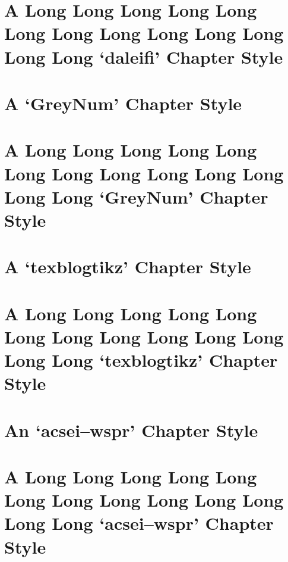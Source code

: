 \documentclass[10pt,a4paper,extrafontsizes,oldfontcommands,oneside]{memoir}
\begin{document}
\chapter{A Long Long Long Long Long Long Long Long Long Long Long Long Long `daleifi' Chapter Style} %
\label{chap:a_long_daleifi_chapter_style}



\chapter{A `GreyNum' Chapter Style} %
\label{chap:a_GreyNum_chapter_style}



\chapter{A Long Long Long Long Long Long Long Long Long Long Long Long Long `GreyNum' Chapter Style} %
\label{chap:a_long_GreyNum_chapter_style}



\chapter{A `texblogtikz' Chapter Style} %
\label{chap:a_texblogtikz_chapter_style}



\chapter{A Long Long Long Long Long Long Long Long Long Long Long Long Long `texblogtikz' Chapter Style} %
\label{chap:a_long_texblogtikz_chapter_style}



\chapter{An `acsei--wspr' Chapter Style} %
\label{chap:a_acsei_chapter_style}



\chapter{A Long Long Long Long Long Long Long Long Long Long Long Long Long `acsei--wspr' Chapter Style} %
\label{chap:a_long_acsei_chapter_style}
\end{document}
